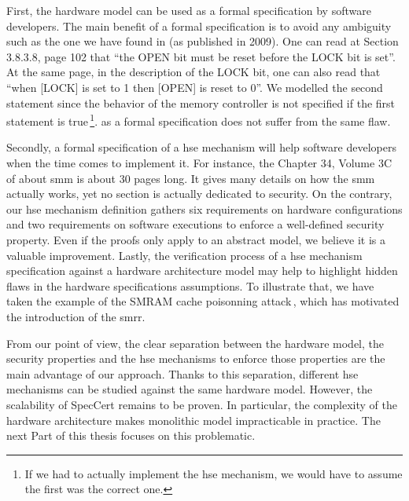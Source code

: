 First, the hardware model  can be used as a formal specification by
software developers. 
%
The main benefit of a formal specification is to avoid any ambiguity such as the
one we have found in \cite{intel2009mch} (as published in 2009).
%
One can read at Section 3.8.3.8, page 102 that ``the OPEN bit must be reset
before the LOCK bit is set''.
%
At the same page, in the description of the LOCK bit, one can also read that
``when [LOCK] is set to 1 then [OPEN] is reset to 0''.
%
We modelled the second statement since the behavior of the memory controller is
not specified if the first statement is true\,\footnote{If we had to actually
  implement the \ac{hse} mechanism, we would have to assume the first was the
  correct one.}.   as a formal specification does not suffer
from the same flaw. 
%

Secondly, a formal specification of a \ac{hse} mechanism will help software
developers when the time comes to implement it.
%
For instance, the Chapter 34, Volume 3C of \cite{intel2014manual} about \ac{smm}
is about 30 pages long. It gives many details on how the \ac{smm} actually
works, yet no section is actually dedicated to security.
%
On the contrary, our \ac{hse} mechanism definition gathers six requirements on
hardware configurations and two requirements on software executions to enforce a
well-defined security property.
%
Even if the proofs only apply to an abstract model, we believe it is a valuable
improvement.
%
Lastly, the verification process of a \ac{hse} mechanism specification against a
hardware architecture model may help to highlight hidden flaws in the hardware
specifications assumptions.
%
To illustrate that, we have taken the example of the SMRAM cache poisonning
attack\,\cite{wojtczuk2009smram,duflot2009smram}, which has motivated the
introduction of the \ac{smrr}.

From our point of view, the clear separation between the hardware model, the
security properties and the \ac{hse} mechanisms to enforce those properties are
the main advantage of our approach. Thanks to this separation, different \ac{hse} mechanisms can be studied against the same hardware model.
%
However, the scalability of SpecCert remains to be proven.
%
In particular, the complexity of the hardware architecture makes monolithic
model impracticable in practice. 
%
The next Part of this thesis focuses on this problematic.

